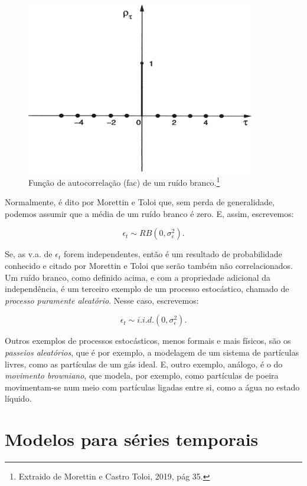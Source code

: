 \begin{figure}[htb]
\centering
\includegraphics[width=10cm]{figuras/fac_ruido}
\caption{Função de autocorrelação (fac) de um ruído branco.\footnote{Extraido de Morettin e Castro Toloi, 2019, pág 35.}}
\label{fig:fac_ruido}
\end{figure}

Normalmente, é dito por Morettin e Toloi \citep{morettin} que, sem perda de generalidade, podemos assumir que a média de um ruído branco é zero. E, assim, escrevemos:

\[ \epsilon_t \sim RB (0, \sigma_\epsilon^2). \]

Se, as v.a. de $\epsilon_t$ forem independentes, então é um resultado de probabilidade conhecido e citado por Morettin e Toloi \citep{morettin} que serão também não correlacionados. Um ruído branco, como definido acima, e com a propriedade adicional da independência, é um terceiro exemplo de um processo estocástico, chamado de \emph{processo puramente aleatório}. Nesse caso, escrevemos:

\[ \epsilon_t \sim i.i.d. (0, \sigma_\epsilon^2). \]

Outros exemplos de processos estocásticos, menos formais e mais físicos, são os \emph{passeios aleatórios}, que é por exemplo, a modelagem de um sistema de partículas livres, como as partículas de um gás ideal. E, outro exemplo, análogo, é o do \emph{movimento browniano}, que modela, por exemplo, como partículas de poeira movimentam-se num meio com partículas ligadas entre si, como a água no estado líquido.

\section{Modelos para séries temporais}

